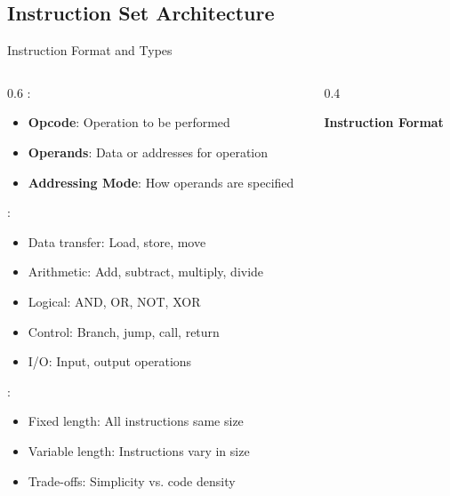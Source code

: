 \subsection{Instruction Set Architecture}

\begin{frame}{Instruction Format and Types}
\begin{columns}
\begin{column}{0.6\textwidth}
:
\begin{itemize}
\item \textbf{Opcode}: Operation to be performed
\item \textbf{Operands}: Data or addresses for operation
\item \textbf{Addressing Mode}: How operands are specified
\end{itemize}

\vspace{0.3cm}
:
\begin{itemize}
\item Data transfer: Load, store, move
\item Arithmetic: Add, subtract, multiply, divide
\item Logical: AND, OR, NOT, XOR
\item Control: Branch, jump, call, return
\item I/O: Input, output operations
\end{itemize}

\vspace{0.3cm}
:
\begin{itemize}
\item Fixed length: All instructions same size
\item Variable length: Instructions vary in size
\item Trade-offs: Simplicity vs. code density
\end{itemize}
\end{column}
\begin{column}{0.4\textwidth}
\begin{center}
\textbf{Instruction Format}
\vspace{0.3cm}

\end{center}
\end{column}
\end{columns}
\end{frame}

